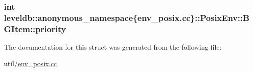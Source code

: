 \subsubsection[{priority}]{\setlength{\rightskip}{0pt plus 5cm}int leveldb\+::anonymous\+\_\+namespace\{env\+\_\+posix.\+cc\}\+::Posix\+Env\+::\+B\+G\+Item\+::priority}\label{structleveldb_1_1anonymous__namespace_02env__posix_8cc_03_1_1_posix_env_1_1_b_g_item_a51d44936b20bcb7acfe5b51da9570f32}


The documentation for this struct was generated from the following file\+:\begin{DoxyCompactItemize}
\item 
util/\hyperlink{env__posix_8cc}{env\+\_\+posix.\+cc}\end{DoxyCompactItemize}
